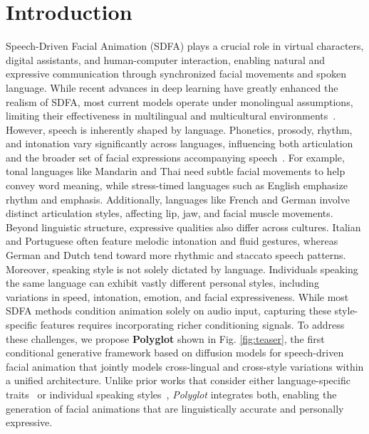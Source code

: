 \documentclass[a4paper, 10pt, conference]{ieeeconf}      %
\begin{document}
\section{Introduction}
\label{sec:intro}
Speech-Driven Facial Animation (SDFA) plays a crucial role in virtual characters, digital assistants, and human-computer interaction, enabling natural and expressive communication through synchronized facial movements and spoken language. While recent advances in deep learning have greatly enhanced the realism of SDFA, most current models operate under monolingual assumptions, limiting their effectiveness in multilingual and multicultural environments~\cite{Fan_Lin_Saito_Wang_Komura_faceformer_2022, nocentini2024scantalk3dtalkingheads, VOCA2019, sun2023diffposetalk, peng2023selftalk, xing2023codetalker}.
However, speech is inherently shaped by language. Phonetics, prosody, rhythm, and intonation vary significantly across languages, influencing both articulation and the broader set of facial expressions accompanying speech~\cite{Ladefoged2000VowelsAC}. For example, tonal languages like Mandarin and Thai need subtle facial movements to help convey word meaning, while stress-timed languages such as English emphasize rhythm and emphasis. Additionally, languages like French and German involve distinct articulation styles, affecting lip, jaw, and facial muscle movements. Beyond linguistic structure, expressive qualities also differ across cultures. Italian and Portuguese often feature melodic intonation and fluid gestures, whereas German and Dutch tend toward more rhythmic and staccato speech patterns.
Moreover, speaking style is not solely dictated by language. Individuals speaking the same language can exhibit vastly different personal styles, including variations in speed, intonation, emotion, and facial expressiveness. While most SDFA methods condition animation solely on audio input, capturing these style-specific features requires incorporating richer conditioning signals.
To address these challenges, we propose \textbf{Polyglot} shown in Fig. \ref{fig:teaser}, the first conditional generative framework based on diffusion models for speech-driven facial animation that jointly models cross-lingual and cross-style variations within a unified architecture. Unlike prior works that consider either language-specific traits~\cite{sungbin2024multitalkenhancing3dtalking} or individual speaking styles~\cite{sun2023diffposetalk}, \textit{Polyglot} integrates both, enabling the generation of facial animations that are linguistically accurate and personally expressive.
\end{document}
